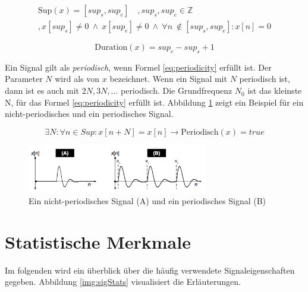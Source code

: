 \begin{equation}
\label{eq:support}
\begin{split}
\text{Sup}(x) = [sup_s, sup_e] \quad , sup_s, sup_e \in \mathbb{Z} \\,  x[sup_s] \neq 0 \:  \wedge \:  x[sup_e] \neq 0 \: \wedge \: \forall n \
\not\in [sup_s, sup_e] : x[n] = 0
\end{split}
\end{equation}

\begin{equation}
\text{Duration}(x) = sup_e - sup_s + 1
\label{eq:duration}
\end{equation}

Ein Signal gilt als \emph{periodisch}, wenn Formel \ref{eq:periodicity} erfüllt ist. Der Parameter $N$ wird als  von $x$ bezeichnet. Wenn ein Signal mit $N$ periodisch ist, dann ist es auch mit $2N, 3N, \ldots $ periodisch. Die Grundfrequenz $N_0$ ist das kleinste N, für das Formel \ref{eq:periodicity} erfüllt ist. Abbildung \ref{img:periodicSic} zeigt ein Beispiel für ein nicht-periodisches und ein periodisches Signal. \cite[S. 24]{dspMichigan}

\begin{equation}
\exists N : \forall n \in Sup : x[n+N] = x[n] \rightarrow \text{Periodisch}(x) = true
\label{eq:periodicity}
\end{equation}

\begin{figure}[h]
	\centering
	\includegraphics[width=0.7\textwidth]{bilder/periodicSig.png}
	\caption{Ein nicht-periodisches Signal (A) und ein periodisches Signal (B)}
	\label{img:periodicSic}
\end{figure}

\section{Statistische Merkmale}

Im folgenden wird ein überblick über die häufig verwendete Signaleigenschaften gegeben. Abbildung \ref{img:sigStats} visualisiert die Erläuterungen.

